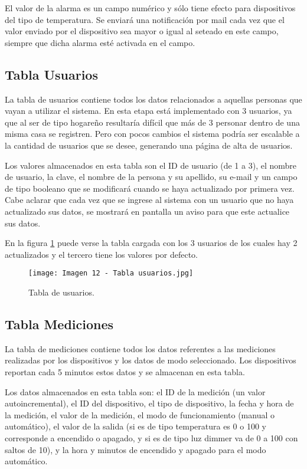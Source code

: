 El valor de la alarma es un campo numérico y sólo tiene efecto para dispositivos del tipo de temperatura. Se enviará una notificación por mail cada vez que el valor enviado por el dispositivo sea mayor o igual al seteado en este campo, siempre que dicha alarma esté activada en el campo.

\subsection{Tabla Usuarios}

La tabla de usuarios contiene todos los datos relacionados a aquellas personas que vayan a utilizar el sistema. En esta etapa está implementado con 3 usuarios, ya que al ser de tipo hogareño resultaría difícil que más de 3 personar dentro de una misma casa se registren. Pero con pocos cambios el sistema podría ser escalable a la cantidad de usuarios que se desee, generando una página de alta de usuarios.

Los valores almacenados en esta tabla son el ID de usuario (de 1 a 3), el nombre de usuario, la clave, el nombre de la persona y su apellido, su e-mail y un campo de tipo booleano que se modificará cuando se haya actualizado por primera vez. Cabe aclarar que cada vez que se ingrese al sistema con un usuario que no haya actualizado sus datos, se mostrará en pantalla un aviso para que este actualice sus datos.

En la figura \ref{fig:12} puede verse la tabla cargada con los 3 usuarios de los cuales hay 2 actualizados y el tercero tiene los valores por defecto.

\begin{figure}[h]
\centering
\texttt{[image: Imagen 12 - Tabla usuarios.jpg]}
\caption[Tabla usuarios]{Tabla de usuarios. \footnotemark}
\label{fig:12}
\end{figure}

\subsection{Tabla Mediciones}

La tabla de mediciones contiene todos los datos referentes a las mediciones realizadas por los dispositivos y los datos de modo seleccionado. Los dispositivos reportan cada 5 minutos estos datos y se almacenan en esta tabla.

Los datos almacenados en esta tabla son: el ID de la medición (un valor autoincremental), el ID del dispositivo, el tipo de dispositivo, la fecha y hora de la medición, el valor de la medición, el modo de funcionamiento (manual o automático), el valor de la salida (si es de tipo temperatura es 0 o 100 y corresponde a encendido o apagado, y si es de tipo luz dimmer va de 0 a 100 con saltos de 10), y la hora y minutos de encendido y apagado para el modo automático.

